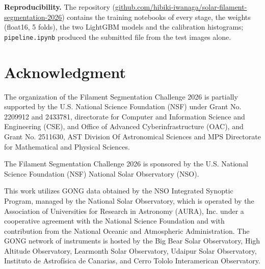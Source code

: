 \documentclass[sigconf]{acmart}
\begin{document}
{\sloppy \textbf{Reproducibility.} The repository (\href{https://github.com/hibiki-iwanaga/solar-filament-segmentation-2026}{github.com/\allowbreak hibiki-iwanaga/\allowbreak solar-\allowbreak filament-\allowbreak segmentation-2026}) contains the training notebooks of every stage, the weights (float16, 5 folds), the two LightGBM models and the calibration histograms; \texttt{pipeline.ipynb} produced the submitted file from the test images alone.\par}

\section{Acknowledgment}\label{sec:acknowledgment}
    The organization of the Filament Segmentation Challenge 2026 is partially supported by the U.S. National Science Foundation (NSF) under Grant No. 2209912 and 2433781, directorate for Computer and Information Science and Engineering (CSE), and Office of Advanced Cyberinfrastructure (OAC), and Grant No. 2511630, AST Division Of Astronomical Sciences and MPS Directorate for Mathematical and Physical Sciences.

    The Filament Segmentation Challenge 2026 is sponsored by the U.S. National Science Foundation (NSF) National Solar Observatory (NSO).

    This work utilizes GONG data obtained by the NSO Integrated Synoptic Program, managed by the National Solar Observatory, which is operated by the Association of Universities for Research in Astronomy (AURA), Inc. under a cooperative agreement with the National Science Foundation and with contribution from the National Oceanic and Atmospheric Administration. The GONG network of instruments is hosted by the Big Bear Solar Observatory, High Altitude Observatory, Learmonth Solar Observatory, Udaipur Solar Observatory, Instituto de Astrofísica de Canarias, and Cerro Tololo Interamerican Observatory.



\end{document}
